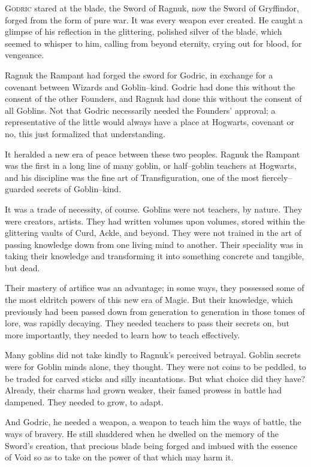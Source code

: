 
\lettrine{G}{odric} stared at the blade, the Sword of Ragnuk, now the Sword of Gryffindor, forged from the form of pure war. It was every weapon ever created. He caught a glimpse of his reflection in the glittering, polished silver of the blade, which seemed to whisper to him, calling from beyond eternity, crying out for blood, for vengeance.

Ragnuk the Rampant had forged the sword for Godric, in exchange for a covenant between Wizards and Goblin\mbox{--}kind. Godric had done this without the consent of the other Founders, and Ragnuk had done this without the consent of all Goblins. Not that Godric necessarily needed the Founders’ approval; a representative of the little would always have a place at Hogwarts, covenant or no, this just formalized that understanding.

It heralded a new era of peace between these two peoples. Ragnuk the Rampant was the first in a long line of many goblin, or half\mbox{--}goblin teachers at Hogwarts, and his discipline was the fine art of Transfiguration, one of the most fiercely\mbox{--}guarded secrets of Goblin\mbox{--}kind.

It was a trade of necessity, of course. Goblins were not teachers, by nature. They were creators, artists. They had written volumes upon volumes, stored within the glittering vaults of Curd, Ackle, and beyond. They were not trained in the art of passing knowledge down from one living mind to another. Their speciality was in taking their knowledge and transforming it into something concrete and tangible, but dead.

Their mastery of artifice was an advantage; in some ways, they possessed some of the most eldritch powers of this new era of Magic. But their knowledge, which previously had been passed down from generation to generation in those tomes of lore, was rapidly decaying. They needed teachers to pass their secrets on, but more importantly, they needed to learn how to teach effectively.

Many goblins did not take kindly to Ragnuk’s perceived betrayal. Goblin secrets were for Goblin minds alone, they thought. They were not coins to be peddled, to be traded for carved sticks and silly incantations. But what choice did they have? Already, their charms had grown weaker, their famed prowess in battle had dampened. They needed to grow, to adapt.

And Godric, he needed a weapon, a weapon to teach him the ways of battle, the ways of bravery. He still shuddered when he dwelled on the memory of the Sword’s creation, that precious blade being forged and imbued with the essence of Void so as to take on the power of that which may harm it.

